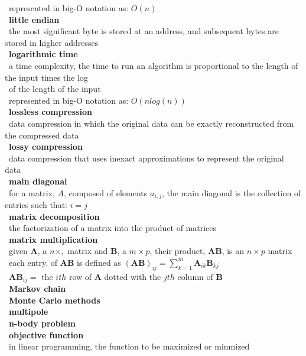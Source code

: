 \documentclass[10pt,letterpaper]{scrartcl}
\newcommand{\tbul}{\textbullet}
\newcommand{\tend}{\>\textendash}
\begin{document}
\begin{tabbing}
    \tend\ represented in big-O notation as: $O(n)$ \\
\tbul\ \textbf{little endian} \\
    \tend\ the most significant byte is stored at an address, and subsequent bytes are stored in higher addresses\\
\tbul\ \textbf{logarithmic time} \\
    \tend\ a time complexity, the time to run an algorithm is proportional to the length of the input times the log \\ \>\ of the length of the input \\
    \tend\ represented in big-O notation as: $O(nlog(n))$ \\
\tbul\ \textbf{lossless compression} \\ 
    \tend\ data compression in which the original data can be exactly reconstructed from the compressed data \\
\tbul\ \textbf{lossy compression} \\ 
    \tend\ data compression that uses inexact approximations to represent the original data \\
\tbul\ \textbf{main diagonal} \\
    \tend\ for a matrix, $A$, composed of elements $a_{i,j}$, the main diagonal is the collection of entries such that: $i=j$ \\
\tbul\ \textbf{matrix decomposition} \\
    \tend\ the factorization of a matrix into the product of matrices \\
\tbul\ \textbf{matrix multiplication} \\
    \tend\ given $\mathbf{A}$, a $n\times ,$ matrix and $\mathbf{B}$, a $m\times p$, their product, $\mathbf{AB}$, is an $n\times p$ matrix\\
    \tend\ each entry, of $\mathbf{AB}$ is defined as $\displaystyle (\mathbf{AB})_{ij} = \sum_{k=1}^{m}\mathbf{A}_{ik}\mathbf{B}_{kj}$ \\
    \tend\ $\mathbf{AB}_{ij}=$ the $ith$ row of $\mathbf{A}$ dotted with the $jth$ column of $\mathbf{B}$ \\
\tbul\ \textbf{Markov chain} \\
\tbul\ \textbf{Monte Carlo methods} \\
\tbul\ \textbf{multipole} \\
\tbul\ \textbf{n-body problem} \\
\tbul\ \textbf{objective function} \\
    \tend\ in linear programming, the function to be maximized or minmized \\

\end{tabbing}
\end{document}
